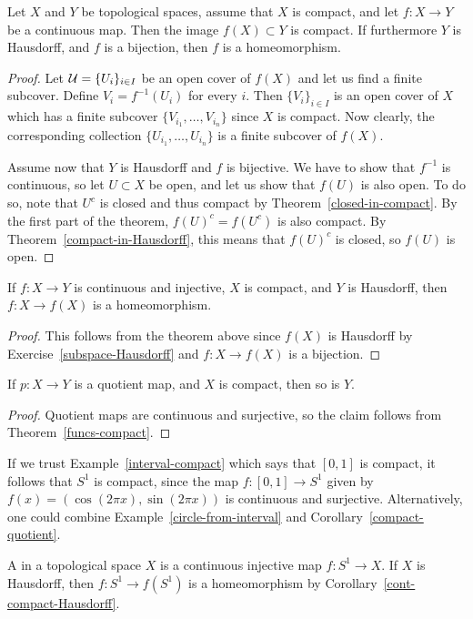 \begin{thm}
  \label{funcs-compact}
  Let $X$ and $Y$ be topological spaces, assume that $X$ is compact, and let $f : X \to Y$ be a continuous map. Then the image $f(X) \subset Y$ is compact. If furthermore $Y$ is Hausdorff, and $f$ is a bijection, then $f$ is a homeomorphism.
\end{thm}
\begin{proof}
  Let $\mathcal{U} = \{U_i \}_{i \in I}$ be an open cover of $f(X)$ and let us find a finite subcover. Define $V_i = f^{-1}(U_i)$ for every $i$. Then $\{V_i\}_{i \in I}$ is an open cover of $X$ which has a finite subcover $\{V_{i_1}, \dots, V_{i_n}\}$ since $X$ is compact. Now clearly, the corresponding collection $\{U_{i_1}, \dots, U_{i_n}\}$ is a finite subcover of $f(X)$.
  
  Assume now that $Y$ is Hausdorff and $f$ is bijective. We have to show that $f^{-1}$ is continuous, so let $U \subset X$ be open, and let us show that $f(U)$ is also open. To do so, note that $U^c$ is closed and thus compact by Theorem~\ref{closed-in-compact}. By the first part of the theorem, $f(U)^c = f(U^c)$ is also compact. By Theorem~\ref{compact-in-Hausdorff}, this means that $f(U)^c$ is closed, so $f(U)$ is open.
\end{proof}
\begin{cor}
  \label{cont-compact-Hausdorff}
  If $f: X \to Y$ is continuous and injective, $X$ is compact, and $Y$ is Hausdorff, then $f : X \to f(X)$ is a homeomorphism.  
\end{cor}
\begin{proof}
  This follows from the theorem above since $f(X)$ is Hausdorff by Exercise~\ref{subspace-Hausdorff} and $f : X \to f(X)$ is a bijection.
\end{proof}
\begin{cor}
  \label{compact-quotient}
  If $p : X \to Y$ is a quotient map, and $X$ is compact, then so is $Y$.
\end{cor}
\begin{proof}
  Quotient maps are continuous and surjective, so the claim follows from Theorem~\ref{funcs-compact}.
\end{proof}
\begin{example}
  \label{s1-compact}
  If we trust Example~\ref{interval-compact} which says that $[0,1]$ is compact, it follows that $S^1$ is compact, since the map $f:[0,1] \to S^1$ given by $f(x) = (\cos(2\pi x),\sin(2\pi x))$ is continuous and surjective. Alternatively, one could combine Example~\ref{circle-from-interval} and Corollary~\ref{compact-quotient}.
\end{example}
\begin{example}
  A  in a topological space $X$ is a continuous injective map $f : S^1 \to X$. If $X$ is Hausdorff, then $f : S^1 \to f(S^1)$ is a homeomorphism by Corollary~\ref{cont-compact-Hausdorff}.
\end{example}

